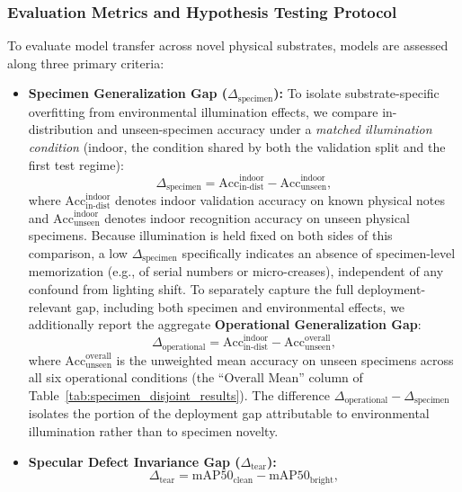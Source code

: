 \documentclass[final,5p,times,twocolumn,authoryear]{elsarticle}
\begin{document}
\subsubsection{Evaluation Metrics and Hypothesis Testing Protocol}
To evaluate model transfer across novel physical substrates, models are assessed along three primary criteria:
\begin{itemize}
    \item \textbf{Specimen Generalization Gap ($\Delta_{\text{specimen}}$):} To isolate substrate-specific overfitting from environmental illumination effects, we compare in-distribution and unseen-specimen accuracy under a \emph{matched illumination condition} (indoor, the condition shared by both the validation split and the first test regime):
    \begin{equation}
    \Delta_{\text{specimen}} = \text{Acc}_{\text{in-dist}}^{\text{indoor}} - \text{Acc}_{\text{unseen}}^{\text{indoor}},
    \end{equation}
    where $\text{Acc}_{\text{in-dist}}^{\text{indoor}}$ denotes indoor validation accuracy on known physical notes and $\text{Acc}_{\text{unseen}}^{\text{indoor}}$ denotes indoor recognition accuracy on unseen physical specimens. Because illumination is held fixed on both sides of this comparison, a low $\Delta_{\text{specimen}}$ specifically indicates an absence of specimen-level memorization (e.g., of serial numbers or micro-creases), independent of any confound from lighting shift. To separately capture the full deployment-relevant gap, including both specimen and environmental effects, we additionally report the aggregate \textbf{Operational Generalization Gap}:
    \begin{equation}
    \Delta_{\text{operational}} = \text{Acc}_{\text{in-dist}}^{\text{indoor}} - \text{Acc}_{\text{unseen}}^{\text{overall}},
    \end{equation}
    where $\text{Acc}_{\text{unseen}}^{\text{overall}}$ is the unweighted mean accuracy on unseen specimens across all six operational conditions (the ``Overall Mean'' column of Table~\ref{tab:specimen_disjoint_results}). The difference $\Delta_{\text{operational}} - \Delta_{\text{specimen}}$ isolates the portion of the deployment gap attributable to environmental illumination rather than to specimen novelty.
    \item \textbf{Specular Defect Invariance Gap ($\Delta_{\text{tear}}$):}
    \begin{equation}
    \Delta_{\text{tear}} = \text{mAP50}_{\text{clean}} - \text{mAP50}_{\text{bright}},

\end{equation}
\end{itemize}
\end{document}
